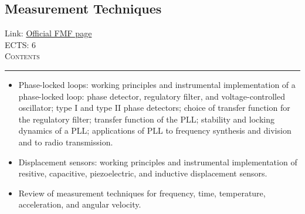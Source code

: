 \documentclass[11pt, a4paper]{article}
\newenvironment{course}[3]{
\subsection{#1}%
Link: \href{#2}{Official FMF page}\\%
ECTS: #3%
\vspace{1ex}
\\
{\large \textsc{Contents}}\\[-0.9ex]%
\rule{\textwidth}{0.5pt}
\vspace{-3ex}
}
{}
\newenvironment{chapter}[1]{
\begin{tcolorbox}[title=#1, breakable]
}
{\end{tcolorbox}}
\begin{document}
\begin{course}{Measurement Techniques}{https://www.fmf.uni-lj.si/en/study-physics/programmes/1fiz/2020/7000777/courses/1441/}{6}
\begin{chapter}{Important measurement techniques}
\begin{itemize}
            \item Phase-locked loops: working principles and instrumental implementation of a phase-locked loop: phase detector, regulatory filter, and voltage-controlled oscillator; type I and type II phase detectors; choice of transfer function for the regulatory filter; transfer function of the PLL; stability and locking dynamics of a PLL; applications of PLL to frequency synthesis and division and to radio transmission.

            \item Displacement sensors: working principles and instrumental implementation of resitive, capacitive, piezoelectric, and inductive displacement sensors.

            \item Review of measurement techniques for frequency, time, temperature, acceleration, and angular velocity.
        
        \end{itemize}
    \end{chapter}
\end{course}
\end{document}
